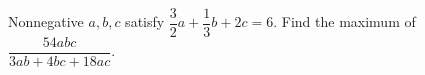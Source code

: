 Nonnegative $a,b,c$ satisfy $\dfrac32a+\dfrac13b+2c=6$. Find the maximum of $\dfrac{54abc}{3ab+4bc+18ac}$.

